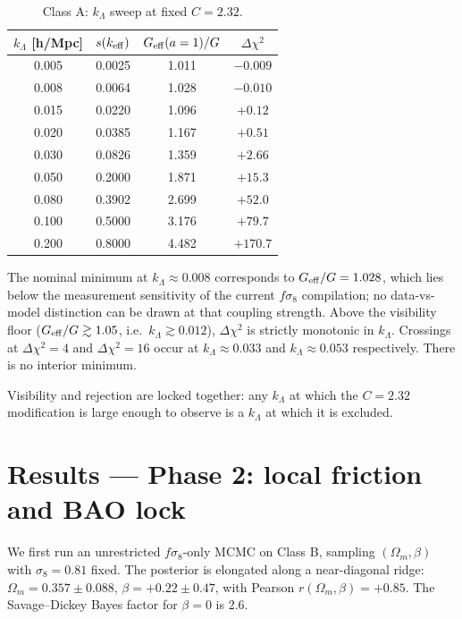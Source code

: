 \documentclass[11pt,a4paper]{article}
\begin{document}
\begin{table}[!ht]
\centering\small
\caption{Class A: $k_\Lambda$ sweep at fixed $C = 2.32$.}
\label{tab:klambda_sweep}
\begin{tabular}{@{}cccc@{}}
\toprule
$k_\Lambda$ [h/Mpc] & $s(k_{\rm eff})$ & $G_{\rm eff}(a=1)/G$ & $\Delta\chi^2$ \\
\midrule
0.005 & 0.0025 & 1.011 & $-0.009$ \\
0.008 & 0.0064 & 1.028 & $-0.010$ \\
0.015 & 0.0220 & 1.096 & $+0.12$ \\
0.020 & 0.0385 & 1.167 & $+0.51$ \\
0.030 & 0.0826 & 1.359 & $+2.66$ \\
0.050 & 0.2000 & 1.871 & $+15.3$ \\
0.080 & 0.3902 & 2.699 & $+52.0$ \\
0.100 & 0.5000 & 3.176 & $+79.7$ \\
0.200 & 0.8000 & 4.482 & $+170.7$ \\
\bottomrule
\end{tabular}
\end{table}

The nominal minimum at $k_\Lambda \approx 0.008$ corresponds to $G_{\rm eff}/G = 1.028$, which lies below the measurement sensitivity of the current $f\sigma_8$ compilation; no data-vs-model distinction can be drawn at that coupling strength. Above the visibility floor ($G_{\rm eff}/G \gtrsim 1.05$, i.e.\ $k_\Lambda \gtrsim 0.012$), $\Delta\chi^2$ is strictly monotonic in $k_\Lambda$. Crossings at $\Delta\chi^2 = 4$ and $\Delta\chi^2 = 16$ occur at $k_\Lambda \approx 0.033$ and $k_\Lambda \approx 0.053$ respectively. There is no interior minimum.

Visibility and rejection are locked together: any $k_\Lambda$ at which the $C = 2.32$ modification is large enough to observe is a $k_\Lambda$ at which it is excluded.

\section{Results --- Phase 2: local friction and BAO lock}
\label{sec:results_B}

We first run an unrestricted $f\sigma_8$-only MCMC on Class B, sampling $(\Omega_m, \beta)$ with $\sigma_8 = 0.81$ fixed. The posterior is elongated along a near-diagonal ridge: $\Omega_m = 0.357 \pm 0.088$, $\beta = +0.22 \pm 0.47$, with Pearson $r(\Omega_m, \beta) = +0.85$. The Savage--Dickey Bayes factor for $\beta = 0$ is 2.6.
\end{document}
